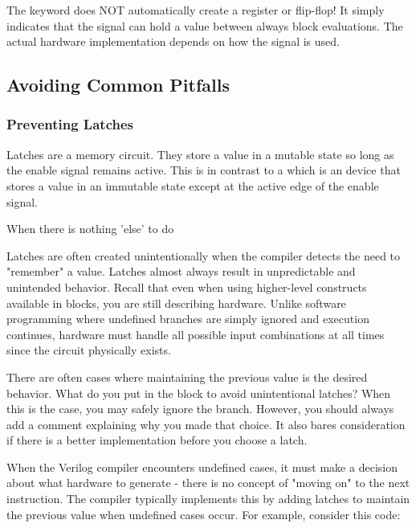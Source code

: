 \documentclass[12pt]{labmanual}
\begin{document}
\begin{extra}
The  keyword does NOT automatically create a register or flip-flop! It simply indicates that the signal can hold a value between always block evaluations. The actual hardware implementation depends on how the signal is used.
\end{extra}

\subsection{Avoiding Common Pitfalls}

\subsubsection{Preventing Latches}
Latches are a  memory circuit. They store a value in a mutable state so long as the enable signal remains active. This is in contrast to a  which is an  device that stores a value in an immutable state except at the active edge of the enable signal.
\begin{aside}[0.6,0.4]{When there is nothing 'else' to do}
\begin{leftcontent}
Latches are often created unintentionally when the compiler detects the need to "remember" a value. Latches almost always result in unpredictable and unintended behavior. Recall that even when using higher-level constructs available in  blocks, you are still describing hardware. Unlike software programming where undefined branches are simply ignored and execution continues, hardware must handle all possible input combinations at all times since the circuit physically exists. 
\end{leftcontent}
\begin{rightcontent}
    There are often cases where maintaining the previous value is the desired behavior. What do you put in the  block to avoid unintentional latches? When this is the case, you may safely ignore the  branch. However, you should always add a comment explaining why you made that choice. It also bares consideration if there is a better implementation before you choose a latch.
\end{rightcontent}
\end{aside}
When the Verilog compiler encounters undefined cases, it must make a decision about what hardware to generate - there is no concept of "moving on" to the next instruction. The compiler typically implements this by adding latches to maintain the previous value when undefined cases occur. For example, consider this code: 
\end{document}
